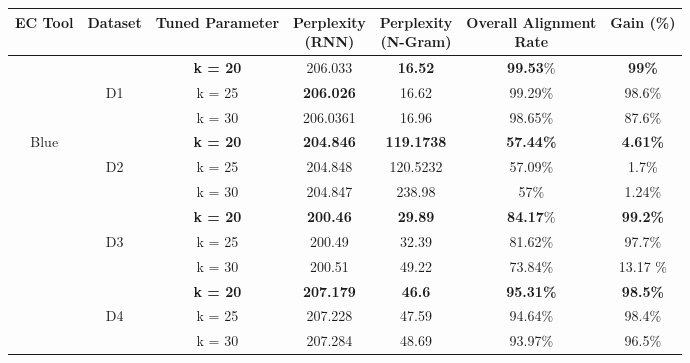 \begin{table}
\centering
\small
\begin{tabular}{ |c|c|c|c|c|c|c| } 
\hline
EC Tool & {Dataset} & Tuned Parameter & \makecell{Perplexity\\(RNN)} & \makecell{Perplexity\\(N-Gram)} & \makecell{Overall Alignment\\ Rate} & Gain (\%) \\ 
 \hline
						 &  & \textbf{k = 20} &  206.033 &  \textbf{16.52} & \textbf{99.53}\% & \textbf{99\%} \\ 
					   & D1 & k = 25 &  \textbf{206.026} &  16.62 & 99.29\% & 98.6\%\\ 
					   &  & k = 30 &  206.0361 &  16.96 & 98.65\% & 87.6\% 
 \\\cline{2-7}
 \multirow{4}{*}{Blue} &  & \textbf{k = 20} & \textbf{204.846} & \textbf{119.1738} & \textbf{57.44\%} & \textbf{4.61\%} \\ 
 					   & D2 & k = 25 &  204.848 & 120.5232 & 57.09\% & 1.7\% \\ 
 					   &  & k = 30 & 204.847 & 238.98 & 57\%  & 1.24\%  
 \\\cline{2-7}
 					  &  & \textbf{k = 20} & \textbf{200.46}  & \textbf{29.89} & \textbf{84.17}\% & \textbf{99.2\%} \\ 
  					  & D3 & k = 25 & 200.49   & 32.39 & 81.62\% & 97.7\% \\ 
  					  &  & k = 30 & 200.51 & 49.22 & 73.84\% & 13.17 \%
 \\\cline{2-7}                     
                        &  & \textbf{k = 20} & \textbf{207.179} & \textbf{46.6} & \textbf{95.31\%} & \textbf{98.5\%} \\
                       & D4 & k = 25 & 207.228 & 47.59 & 94.64\% & 98.4\% \\  
                &  & k = 30 & 207.284 & 48.69 & 93.97\%   & 96.5\%     
                         

\end{tabular}
\end{table}
